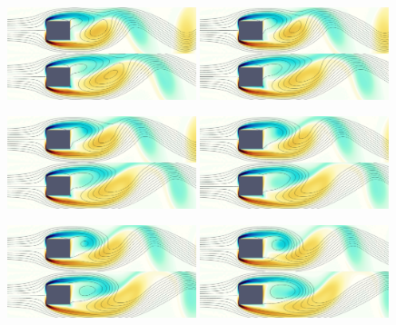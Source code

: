 \begin{figure}
  \centering
  \includegraphics[width=0.49\textwidth]{./fig/AR1p25/snap/snap.0000.png}
  \includegraphics[width=0.49\textwidth]{./fig/AR1p25/snap/snap.0005.png}
  \includegraphics[width=0.49\textwidth]{./fig/AR1p25/snap/snap.0010.png}
  \includegraphics[width=0.49\textwidth]{./fig/AR1p25/snap/snap.0015.png}
  \includegraphics[width=0.49\textwidth]{./fig/AR1p25/snap/snap.0020.png}
  \includegraphics[width=0.49\textwidth]{./fig/AR1p25/snap/snap.0025.png}

\end{figure}
